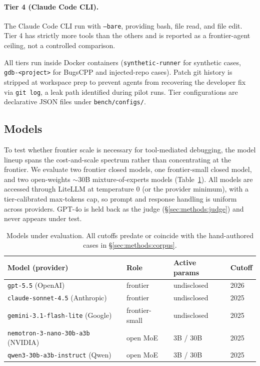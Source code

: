 \documentclass[11pt]{article}
\begin{document}
\paragraph{Tier 4 (Claude Code CLI).} The Claude Code CLI run with \texttt{--bare}, providing bash, file read, and file edit. Tier 4 has strictly more tools than the others and is reported as a frontier-agent ceiling, not a controlled comparison.

All tiers run inside Docker containers (\texttt{synthetic-runner} for synthetic cases, \texttt{gdb-<project>} for BugsCPP and injected-repo cases). Patch git history is stripped at workspace prep to prevent agents from recovering the developer fix via \texttt{git log}, a leak path identified during pilot runs. Tier configurations are declarative JSON files under \texttt{bench/configs/}.

\subsection{Models}
\label{sec:methods:models}

To test whether frontier scale is necessary for tool-mediated debugging, the model lineup spans the cost-and-scale spectrum rather than concentrating at the frontier. We evaluate two frontier closed models, one frontier-small closed model, and two open-weights $\sim$30B mixture-of-experts models (Table~\ref{tab:models}). All models are accessed through LiteLLM at temperature 0 (or the provider minimum), with a tier-calibrated max-tokens cap, so prompt and response handling is uniform across providers. GPT-4o is held back as the judge (\S\ref{sec:methods:judge}) and never appears under test.

\begin{table}[t]
    \centering
    \small
    \begin{tabular}{@{}llll@{}}
        \toprule
        Model (provider) & Role & Active params & Cutoff \\
        \midrule
        \texttt{gpt-5.5} (OpenAI) & frontier & undisclosed & 2026 \\
        \texttt{claude-sonnet-4.5} (Anthropic) & frontier & undisclosed & 2025 \\
        \texttt{gemini-3.1-flash-lite} (Google) & frontier-small & undisclosed & 2025 \\
        \texttt{nemotron-3-nano-30b-a3b} (NVIDIA) & open MoE & 3B / 30B & 2025 \\
        \texttt{qwen3-30b-a3b-instruct} (Qwen) & open MoE & 3B / 30B & 2025 \\
        \bottomrule
    \end{tabular}
    \caption{Models under evaluation. All cutoffs predate or coincide with the hand-authored cases in \S\ref{sec:methods:corpus}.}
    \label{tab:models}
\end{table}
\end{document}
